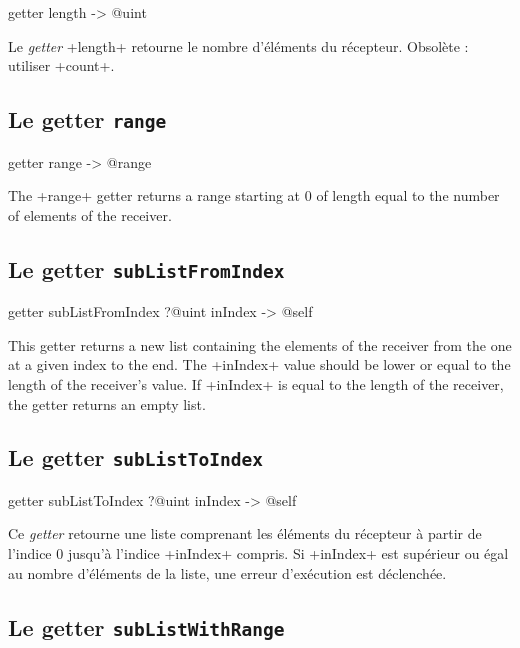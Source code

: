 \begin{galgas}
getter length -> @uint
\end{galgas}

Le \emph{getter} \ggs+length+ retourne le nombre d'éléments du récepteur. Obsolète : utiliser \ggs+count+.


\subsection{Le getter \texttt{range}}

\begin{galgas}
getter range -> @range
\end{galgas}

The \ggs+range+ getter returns a range starting at $0$ of length equal to the number of elements of the receiver.




\subsection{Le getter \texttt{subListFromIndex}}

\begin{galgas}
getter subListFromIndex ?@uint inIndex -> @self
\end{galgas}

This getter returns a new list containing the elements of the receiver from the one at a given index to the end. The  \ggs+inIndex+ value should be lower or equal to the length of the receiver's value. If \ggs+inIndex+ is equal to the length of the receiver, the getter returns an empty list.






\subsection{Le getter \texttt{subListToIndex}}

\begin{galgas}
getter subListToIndex ?@uint inIndex -> @self
\end{galgas}

Ce \emph{getter} retourne une liste comprenant les éléments du récepteur à partir de l'indice $0$ jusqu'à l'indice \ggs+inIndex+ compris. Si \ggs+inIndex+ est supérieur ou égal au nombre d'éléments de la liste, une erreur d'exécution est déclenchée.




\subsection{Le getter \texttt{subListWithRange}}

